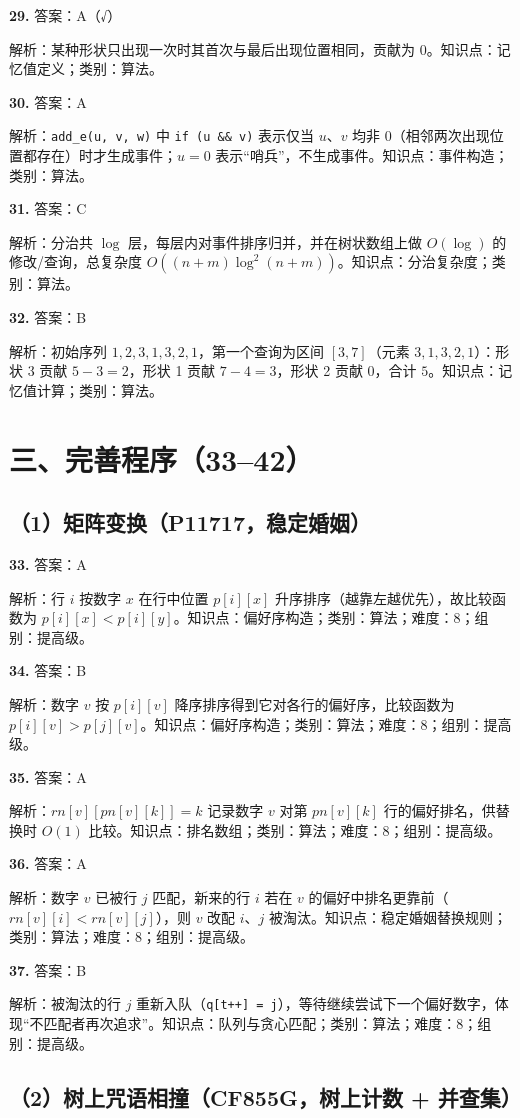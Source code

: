 \documentclass[a4paper]{ctexart}
\newcommand{\ans}[2]{\noindent\textbf{#1} \quad 答案：#2\par}
\newcommand{\expn}[1]{\hspace*{1.5em} 解析：#1\par}
\begin{document}
\ans{29.}{A（√）}
\expn{某种形状只出现一次时其首次与最后出现位置相同，贡献为 0。\quad 知识点：记忆值定义；类别：算法。}

\ans{30.}{A}
\expn{\texttt{add\_e(u, v, w)} 中 \texttt{if (u \&\& v)} 表示仅当 $u$、$v$ 均非 0（相邻两次出现位置都存在）时才生成事件；$u=0$ 表示“哨兵”，不生成事件。\quad 知识点：事件构造；类别：算法。}

\ans{31.}{C}
\expn{分治共 $\log$ 层，每层内对事件排序归并，并在树状数组上做 $O(\log)$ 的修改/查询，总复杂度 $O((n+m)\log^2(n+m))$。\quad 知识点：分治复杂度；类别：算法。}

\ans{32.}{B}
\expn{初始序列 $1,2,3,1,3,2,1$，第一个查询为区间 $[3,7]$（元素 $3,1,3,2,1$）：形状 3 贡献 $5-3=2$，形状 1 贡献 $7-4=3$，形状 2 贡献 0，合计 $5$。\quad 知识点：记忆值计算；类别：算法。}

\clearpage
\section*{三、完善程序（33--42）}

\subsection*{（1）矩阵变换（P11717，稳定婚姻）}

\ans{33.}{A}
\expn{行 $i$ 按数字 $x$ 在行中位置 $p[i][x]$ 升序排序（越靠左越优先），故比较函数为 $p[i][x]<p[i][y]$。\quad 知识点：偏好序构造；类别：算法；难度：8；组别：提高级。}

\ans{34.}{B}
\expn{数字 $v$ 按 $p[i][v]$ 降序排序得到它对各行的偏好序，比较函数为 $p[i][v]>p[j][v]$。\quad 知识点：偏好序构造；类别：算法；难度：8；组别：提高级。}

\ans{35.}{A}
\expn{$rn[v][pn[v][k]]=k$ 记录数字 $v$ 对第 $pn[v][k]$ 行的偏好排名，供替换时 $O(1)$ 比较。\quad 知识点：排名数组；类别：算法；难度：8；组别：提高级。}

\ans{36.}{A}
\expn{数字 $v$ 已被行 $j$ 匹配，新来的行 $i$ 若在 $v$ 的偏好中排名更靠前（$rn[v][i]<rn[v][j]$），则 $v$ 改配 $i$、$j$ 被淘汰。\quad 知识点：稳定婚姻替换规则；类别：算法；难度：8；组别：提高级。}

\ans{37.}{B}
\expn{被淘汰的行 $j$ 重新入队（\texttt{q[t++] = j}），等待继续尝试下一个偏好数字，体现“不匹配者再次追求”。\quad 知识点：队列与贪心匹配；类别：算法；难度：8；组别：提高级。}

\subsection*{（2）树上咒语相撞（CF855G，树上计数 + 并查集）}
\end{document}
